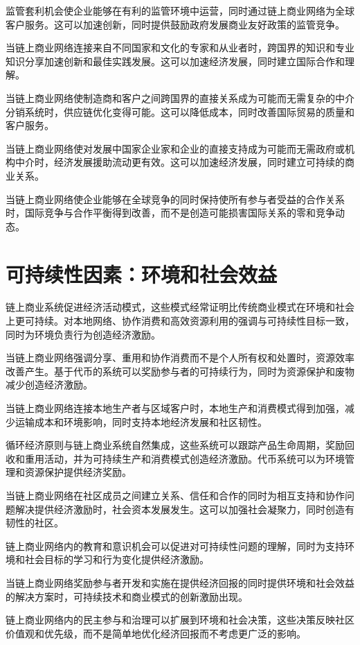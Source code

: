 \documentclass[
  Letterpaper,
]{scrbook}
\begin{document}
监管套利机会使企业能够在有利的监管环境中运营，同时通过链上商业网络为全球客户服务。这可以加速创新，同时提供鼓励政府发展商业友好政策的监管竞争。

当链上商业网络连接来自不同国家和文化的专家和从业者时，跨国界的知识和专业知识分享加速创新和最佳实践发展。这可以加速经济发展，同时建立国际合作和理解。

当链上商业网络使制造商和客户之间跨国界的直接关系成为可能而无需复杂的中介分销系统时，供应链优化变得可能。这可以降低成本，同时改善国际贸易的质量和客户服务。

当链上商业网络使对发展中国家企业家和企业的直接支持成为可能而无需政府或机构中介时，经济发展援助流动更有效。这可以加速经济发展，同时建立可持续的商业关系。

当链上商业网络使企业能够在全球竞争的同时保持使所有参与者受益的合作关系时，国际竞争与合作平衡得到改善，而不是创造可能损害国际关系的零和竞争动态。

\section{可持续性因素：环境和社会效益}\label{ux53efux6301ux7eedux6027ux56e0ux7d20ux73afux5883ux548cux793eux4f1aux6548ux76ca}

链上商业系统促进经济活动模式，这些模式经常证明比传统商业模式在环境和社会上更可持续。对本地网络、协作消费和高效资源利用的强调与可持续性目标一致，同时为环境负责行为创造经济激励。

当链上商业网络强调分享、重用和协作消费而不是个人所有权和处置时，资源效率改善产生。基于代币的系统可以奖励参与者的可持续行为，同时为资源保护和废物减少创造经济激励。

当链上商业网络连接本地生产者与区域客户时，本地生产和消费模式得到加强，减少运输成本和环境影响，同时支持本地经济发展和社区韧性。

循环经济原则与链上商业系统自然集成，这些系统可以跟踪产品生命周期，奖励回收和重用活动，并为可持续生产和消费模式创造经济激励。代币系统可以为环境管理和资源保护提供经济奖励。

当链上商业网络在社区成员之间建立关系、信任和合作的同时为相互支持和协作问题解决提供经济激励时，社会资本发展发生。这可以加强社会凝聚力，同时创造有韧性的社区。

链上商业网络内的教育和意识机会可以促进对可持续性问题的理解，同时为支持环境和社会目标的学习和行为变化提供经济激励。

当链上商业网络奖励参与者开发和实施在提供经济回报的同时提供环境和社会效益的解决方案时，可持续技术和商业模式的创新激励出现。

链上商业网络内的民主参与和治理可以扩展到环境和社会决策，这些决策反映社区价值观和优先级，而不是简单地优化经济回报而不考虑更广泛的影响。
\end{document}

